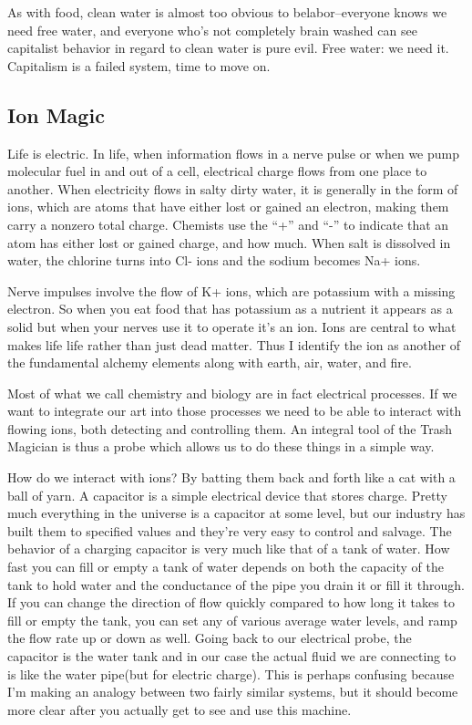 As with food, clean water is almost too obvious to belabor--everyone
knows we need free water, and everyone who's not completely brain washed
can see capitalist behavior in regard to clean water is pure evil. Free
water: we need it. Capitalism is a failed system, time to move on.

\subsection{Ion Magic}\label{ion-magic}

Life is electric. In life, when information flows in a nerve pulse or
when we pump molecular fuel in and out of a cell, electrical charge
flows from one place to another. When electricity flows in salty dirty
water, it is generally in the form of ions, which are atoms that have
either lost or gained an electron, making them carry a nonzero total
charge. Chemists use the ``+'' and ``-'' to indicate that an atom has
either lost or gained charge, and how much. When salt is dissolved in
water, the chlorine turns into Cl- ions and the sodium becomes Na+ ions.

Nerve impulses involve the flow of K+ ions, which are potassium with a
missing electron. So when you eat food that has potassium as a nutrient
it appears as a solid but when your nerves use it to operate it's an
ion. Ions are central to what makes life life rather than just dead
matter. Thus I identify the ion as another of the fundamental alchemy
elements along with earth, air, water, and fire.

Most of what we call chemistry and biology are in fact electrical
processes. If we want to integrate our art into those processes we need
to be able to interact with flowing ions, both detecting and controlling
them. An integral tool of the Trash Magician is thus a probe which
allows us to do these things in a simple way.

How do we interact with ions? By batting them back and forth like a cat
with a ball of yarn. A capacitor is a simple electrical device that
stores charge. Pretty much everything in the universe is a capacitor at
some level, but our industry has built them to specified values and
they're very easy to control and salvage. The behavior of a charging
capacitor is very much like that of a tank of water. How fast you can
fill or empty a tank of water depends on both the capacity of the tank
to hold water and the conductance of the pipe you drain it or fill it
through. If you can change the direction of flow quickly compared to how
long it takes to fill or empty the tank, you can set any of various
average water levels, and ramp the flow rate up or down as well. Going
back to our electrical probe, the capacitor is the water tank and in our
case the actual fluid we are connecting to is like the water pipe(but
for electric charge). This is perhaps confusing because I'm making an
analogy between two fairly similar systems, but it should become more
clear after you actually get to see and use this machine.

